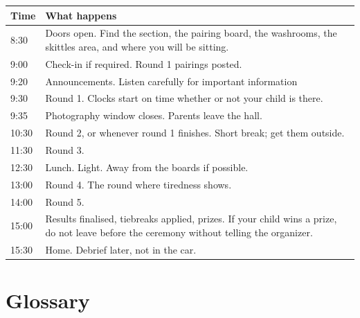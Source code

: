 \documentclass[10pt,letterpaper]{article}
\begin{document}
\begin{center}
\begin{tabularx}{\textwidth}{@{}p{}X@{}}
\toprule
\textbf{Time} & \textbf{What happens} \\
\midrule
8:30 & Doors open. Find the section, the pairing board, the washrooms, the
skittles area, and where you will be sitting. \\
9:00 & Check-in if required. Round 1 pairings posted. \\
9:20 & Announcements. Listen carefully for important information \\
9:30 & Round 1. Clocks start on time whether or not your child is there. \\
9:35 & Photography window closes. Parents leave the hall. \\
10:30 & Round 2, or whenever round 1 finishes. Short break; get them outside. \\
11:30 & Round 3. \\
12:30 & Lunch. Light. Away from the boards if possible. \\
13:00 & Round 4. The round where tiredness shows. \\
14:00 & Round 5. \\
15:00 & Results finalised, tiebreaks applied, prizes. If your child wins a prize, do not leave before the
ceremony without telling the organizer. \\
15:30 & Home. Debrief later, not in the car. \\
\bottomrule
\end{tabularx}
\end{center}

\section{Glossary}
\end{document}
